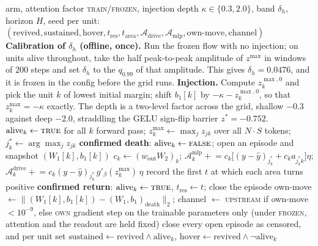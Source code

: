 \documentclass[11pt]{article}
\theoremstyle{definition}
\theoremstyle{remark}
\newcommand{\Ar}{\mathcal{A}}                      %
\begin{document}
\begin{algorithm}[h]
\caption{Hysteresis counter with sustained return (transformer block)}
\label{alg:hist}
\begin{algorithmic}[1]
\REQUIRE arm, attention factor \textsc{train}/\textsc{frozen}, injection depth
$\kappa\in\{0.3,2.0\}$, band $\delta_h$, horizon $H$, seed
\ENSURE per unit: $(\text{revived},\text{sustained},\text{hover},
t_{\mathrm{res}},t_{\mathrm{area}},\Ar_{\mathrm{drive}},\Ar_{\mathrm{mlp}},
\text{own-move},\text{channel})$
\STATE \textbf{Calibration of $\delta_h$ (offline, once).} Run the frozen flow
with no injection; on units alive throughout, take the half peak-to-peak
amplitude of $z^{\max}$ in windows of $200$ steps and set $\delta_h$ to the
$q_{0.99}$ of that amplitude. This gives $\delta_h=0.0476$, and it is frozen in
the config before the grid runs.
\STATE \textbf{Injection.} Compute $z^{\max,0}_k$ and pick the unit $k$ of lowest
initial margin; shift $b_1[k]$ by $-\kappa-z^{\max,0}_k$, so that
$z^{\max}_k=-\kappa$ exactly. The depth is a two-level factor across the grid,
shallow $-0.3$ against deep $-2.0$, straddling the GELU sign-flip barrier
$z^\ast=-0.752$.
\STATE $\mathrm{alive}_k\leftarrow\textsc{true}$ for all $k$
  \STATE forward pass; $z^{\max}_k\leftarrow\max_j z_{jk}$ over all $N\!\cdot\!S$
         tokens; $j^\ast_k\leftarrow\arg\max_j z_{jk}$
    \STATE \textbf{confirmed death}: $\mathrm{alive}_k\leftarrow\textsc{false}$;
           open an episode and snapshot $(W_1[k],b_1[k])$
  \ENDFOR
    \STATE $c_k\leftarrow(w_{\mathrm{out}}W_2)_k$;
           $\Ar^{\mathrm{mlp}}_k\mathrel{+}=
            c_k\bigl[(y-\hat y)_{j^\ast_k}+c_k a_{j^\ast_k k}\bigr]\eta$;
           $\Ar^{\mathrm{drive}}_k\mathrel{+}=
            c_k(y-\hat y)_{j^\ast_k}\,g'_\beta(z^{\max}_k)\,\eta$
    \STATE record the first $t$ at which each area turns positive
  \ENDFOR
    \STATE \textbf{confirmed return}: $\mathrm{alive}_k\leftarrow\textsc{true}$,
           $t_{\mathrm{res}}\leftarrow t$; close the episode
    \STATE own-move $\leftarrow\|(W_1[k],b_1[k])-(W_1,b_1)_{\mathrm{death}}\|_2$;
           channel $\leftarrow$ \textsc{upstream} if own-move $<10^{-9}$, else
           \textsc{own}
  \ENDFOR
  \STATE gradient step on the trainable parameters only (under
         \textsc{frozen}, attention and the readout are held fixed)
\ENDFOR
\STATE close every open episode as censored, and per unit set
       $\text{sustained}\leftarrow\text{revived}\wedge\mathrm{alive}_k$,
       $\text{hover}\leftarrow\text{revived}\wedge\neg\mathrm{alive}_k$
\end{algorithmic}
\end{algorithm}
\end{document}
